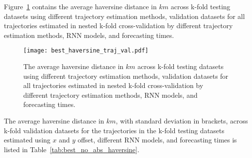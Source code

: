 Figure~\ref{fig:best_haversine_traj_val} contains the average haversine distance in $km$ across k-fold testing datasets using different trajectory estimation methods, validation datasets for all trajectories estimated in nested k-fold cross-validation by different trajectory estimation methods, RNN models, and forecasting times.

\begin{figure}[!ht]
	\centering
	\texttt{[image: best\_haversine\_traj\_val.pdf]}
	\caption{The average haversine distance in $km$ across k-fold testing datasets using different trajectory estimation methods, validation datasets for all trajectories estimated in nested k-fold cross-validation by different trajectory estimation methods, RNN models, and forecasting times.}
	\label{fig:best_haversine_traj_val}
\end{figure}

The average haversine distance in $km$, with standard deviation in brackets, across k-fold validation datasets for the trajectories in the k-fold testing datasets estimated using $x$ and $y$ offset, different RNN models, and forecasting times is listed in Table~\ref{tab:best_no_abs_haversine}.

\begin{table}[!ht]
	\centering
	\caption{The average haversine distance in $km$, with standard deviation in brackets, across k-fold validation datasets for the trajectories in the k-fold testing datasets estimated using $x$ and $y$ offset, different RNN models, and forecasting times.}
	\label{tab:best_no_abs_haversine}
\end{table}

